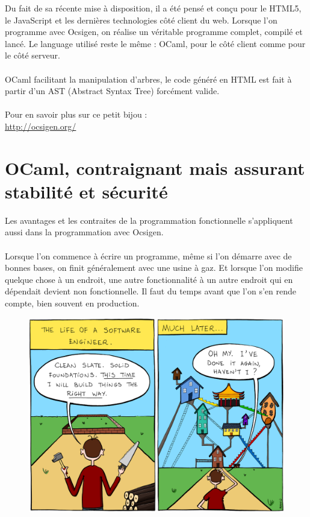 \documentclass{life-fr}
\begin{document}
\newpage

Du fait de sa récente mise à disposition, il a été pensé et conçu pour le HTML5, le JavaScript et les dernières technologies côté client du web. Lorsque l'on programme avec Ocsigen, on réalise un véritable programme complet, compilé et lancé. Le language utilisé reste le même : OCaml, pour le côté client comme pour le côté serveur.\\
\\
OCaml facilitant la manipulation d'arbres, le code généré en HTML est fait à partir d'un AST (Abstract Syntax Tree) forcément valide.\\
\\
Pour en savoir plus sur ce petit bijou :\\
\url{http://ocsigen.org/}

\section{OCaml, contraignant mais assurant stabilité et sécurité}

Les avantages et les contraites de la programmation fonctionnelle s'appliquent aussi dans la programmation avec Ocsigen.\\
\\
Lorsque l'on commence à écrire un programme, même si l'on démarre avec de bonnes bases, on finit généralement avec une usine à gaz. Et lorsque l'on modifie quelque chose à un endroit, une autre fonctionnalité à un autre endroit qui en dépendait devient non fonctionnelle. Il faut du temps avant que l'on s'en rende compte, bien souvent en production.\\

\begin{figure}[H]
  \begin{center}
    \includegraphics[width=13cm]{img/proj.png}
  \end{center}
\end{figure}
\end{document}
